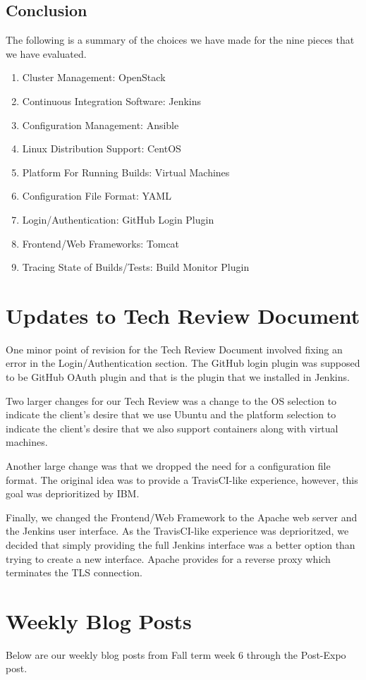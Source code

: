 \documentclass[10pt,letterpaper,onecolumn,draftclsnofoot]{IEEEtran}
\begin{document}
\subsection{Conclusion}
The following is a summary of the choices we have made for the nine pieces that we have evaluated.\\
\begin{enumerate}
  \item Cluster Management: OpenStack
  \item Continuous Integration Software: Jenkins
  \item Configuration Management: Ansible
  \item Linux Distribution Support: CentOS
  \item Platform For Running Builds: Virtual Machines
  \item Configuration File Format: YAML
  \item Login/Authentication: GitHub Login Plugin
  \item Frontend/Web Frameworks: Tomcat
  \item Tracing State of Builds/Tests: Build Monitor Plugin
\end{enumerate}
\section{Updates to Tech Review Document}
One minor point of revision for the Tech Review Document involved fixing an error in the Login/Authentication section.
The GitHub login plugin was supposed to be GitHub OAuth plugin and that is the plugin that we installed in Jenkins.  

Two larger changes for our Tech Review was a change to the OS selection to indicate the client's desire that we use Ubuntu
and the platform selection to indicate the client's desire that we also support containers along with virtual machines.

Another large change was that we  dropped the need for a configuration file format.
The original idea was to provide a TravisCI-like experience, however, this goal was deprioritized by IBM. 

Finally, we changed the Frontend/Web Framework to the Apache web server and the Jenkins user interface. As the TravisCI-like
experience was deprioritzed, we decided that simply providing the full Jenkins interface was a better option than trying to
create a new interface. Apache provides for a reverse proxy which terminates the TLS connection.
\clearpage
\section{Weekly Blog Posts}
Below are our weekly blog posts from Fall term week 6 through the Post-Expo post.
\end{document}
